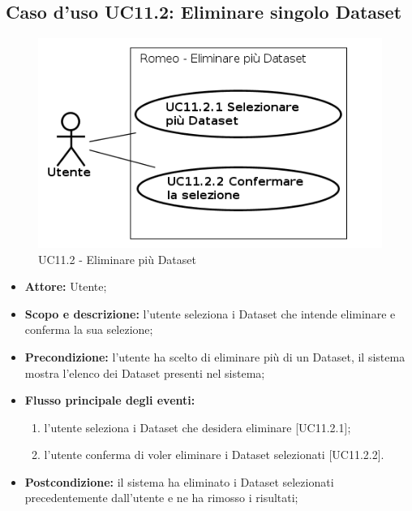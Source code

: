 \subsection{Caso d'uso UC11.2: Eliminare singolo Dataset}
\begin{figure}[!h]
\begin{center}
\includegraphics[scale=0.6]{./img/Use_Case/UC11_2}
\caption{UC11.2 - Eliminare più Dataset}
\end{center}
\end{figure}
\begin{itemize}
\item \textbf{Attore:} Utente;
\item \textbf{Scopo e descrizione:} l'utente seleziona i Dataset\glossario{} che intende eliminare e conferma la sua selezione;
\item \textbf{Precondizione:} l'utente ha scelto di eliminare più di un Dataset\glossario{}, il sistema mostra l'elenco dei Dataset\glossario{} presenti nel sistema;
\item \textbf{Flusso principale degli eventi:}
\begin{enumerate}
\item l'utente seleziona i Dataset\glossario{} che desidera eliminare [UC11.2.1];
\item l'utente conferma di voler eliminare i Dataset\glossario{} selezionati [UC11.2.2].
\end{enumerate}
\item \textbf{Postcondizione:} il sistema ha eliminato i Dataset\glossario{} selezionati precedentemente dall'utente e ne ha rimosso i risultati;
\end{itemize}


